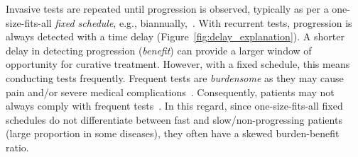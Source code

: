 \documentclass[useAMS, usenatbib, referee]{biom}
\begin{document}
Invasive tests are repeated until progression is observed, typically as per a one-size-fits-all \emph{fixed schedule}, e.g., biannually,~\citep{mcwilliams2008surveillance,bokhorst2015compliance,krist2007timing}. With recurrent tests, progression is always detected with a time delay (Figure~\ref{fig:delay_explanation}). A shorter delay in detecting progression (\emph{benefit}) can provide a larger window of opportunity for curative treatment. However, with a fixed schedule, this means conducting tests frequently. Frequent tests are \textit{burdensome} as they may cause pain and/or severe medical complications~\citep{loeb2013systematic,krist2007timing}. Consequently, patients may not always comply with frequent tests~\citep{bokhorst2015compliance, LeClercq2015325}. In this regard, since one-size-fits-all fixed schedules do not differentiate between fast and slow/non-progressing patients (large proportion in some diseases), they often have a skewed burden-benefit ratio.
\end{document}
